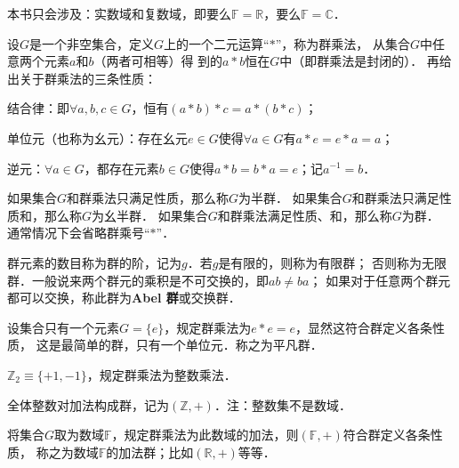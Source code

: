 本书只会涉及：实数域和复数域，即要么$\mathbb{F}=\mathbb{R}$，要么$\mathbb{F}=\mathbb{C}$．



\begin{definition}\label{chtop:def_group}
    设$G$是一个非空集合，定义$G$上的一个二元运算“$*$”，称为{\heiti 群乘法}，
    从集合$G$中任意两个元素$a$和$b$（两者可相等）得
    到的$a*b$恒在$G$中（即群乘法是{\heiti 封闭的}）．
    再给出关于群乘法的三条性质：
    
     结合律：即$\forall a,b,c \in G$，恒有$(a*b)*c=a*(b*c)$；
    
     单位元（也称为幺元）：存在幺元$e\in G$使得$\forall a \in G$有$a*e=e*a=a$；
    
     逆元：$\forall a \in G$，都存在元素$b\in G$使得$a*b=b*a=e$；记$a^{-1}=b$．
    
    如果集合$G$和群乘法只满足性质，那么称$G$为{\heiti 半群}．
    如果集合$G$和群乘法只满足性质和，那么称$G$为{\heiti 幺半群}．
    如果集合$G$和群乘法满足性质、和，那么称$G$为{\heiti 群}．
    通常情况下会省略群乘号“$*$”．  %
\end{definition}
群元素的数目称为群的{\heiti 阶}，记为$g$．若$g$是有限的，则称为{\heiti 有限群}；
否则称为{\heiti 无限群}．一般说来两个群元的乘积是不可交换的，即$ab\neq ba$；
如果对于任意两个群元都可以交换，称此群为{\heiti \bfseries Abel 群}或{\heiti 交换群}．

\begin{example}
    设集合只有一个元素$G=\{e\}$，规定群乘法为$e*e=e$，显然这符合群定义各条性质，
    这是最简单的群，只有一个单位元．称之为{\heiti 平凡群}．
\end{example}

\begin{example}
	$\mathbb{Z}_{2}\equiv \{+1,-1\}$，规定群乘法为整数乘法．  
\end{example}

\begin{example}
	全体整数对加法构成群，记为$(\mathbb{Z},+)$．注：整数集不是数域． 
\end{example}


\begin{example}
    将集合$G$取为数域$\mathbb{F}$，规定群乘法为此数域的加法，则$(\mathbb{F},+)$符合群定义各条性质，
    称之为数域$\mathbb{F}$的{\heiti 加法群}；比如$(\mathbb{R},+)$等等．
\end{example}


